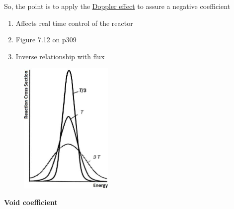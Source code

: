 \documentclass[aspectratio=1610,pdftex,dvipsnames,compress,xcolor={dvipsnames}]{beamer}
\begin{document}
\begin{frame}{So, the point is to apply the \href{https://uidaho.pressbooks.pub/nuclearengineering/chapter/nuclear-reactor-kinetics-2/}{Doppler effect} to assure a negative coefficient}
    \begin{enumerate}[series=outerlist,topsep=0pt,itemsep=21pt,leftmargin=*,label=(\arabic*)]
        \item[]Affects real time control of the reactor
        \item[]Figure 7.12 on p309
        \item[]Inverse relationship with flux
    \end{enumerate}
\end{frame}


\begin{frame}{}
    \begin{figure}
        \centering
        \includegraphics[width=0.40\textwidth]{resonance.jpg}
    \end{figure}
\end{frame}


\begin{frame}[plain]{}
    \centering\LARGE\textbf{Void coefficient}
\end{frame}
\end{document}
